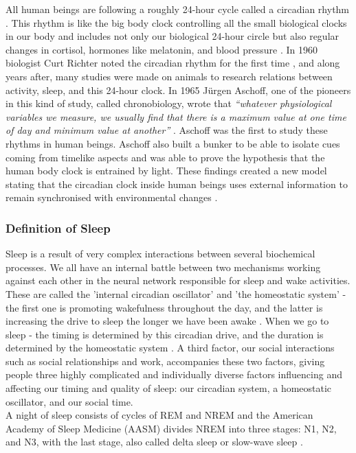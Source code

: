 \documentclass[12pt]{article} %
\begin{document}
All human beings are following a roughly 24-hour cycle called a circadian rhythm \cite{bewellSleep}. This rhythm is like the big body clock controlling all the small biological clocks in our body and includes not only our biological 24-hour circle but also regular changes in cortisol, hormones like melatonin, and blood pressure \cite{bewellSleep}. In 1960 biologist Curt Richter noted the circadian rhythm for the first time \cite{circadian}, and along years after, many studies were made on animals to research relations between activity, sleep, and this 24-hour clock. In 1965 Jürgen Aschoff, one of the pioneers in this kind of study, called chronobiology, wrote that \textit{``whatever physiological variables we measure, we usually find that there is a maximum value at one time of day and minimum value at another''} \cite{rhythm}. Aschoff was the first to study these rhythms in human beings. Aschoff also built a bunker to be able to isolate cues coming from timelike aspects \cite{rhythm2} and was able to prove the hypothesis that the human body clock is entrained by light. These findings created a new model stating that the circadian clock inside human beings uses external information to remain synchronised with environmental changes \cite{bewellSleep}.

\subsubsection{Definition of Sleep}
Sleep is a result of very complex interactions between several biochemical processes. We all have an internal battle between two mechanisms working against each other in the neural network responsible for sleep and wake activities. These are called the 'internal circadian oscillator' and 'the homeostatic system' - the first one is promoting wakefulness throughout the day, and the latter is increasing the drive to sleep the longer we have been awake \cite{promise}. When we go to sleep - the timing is determined by this circadian drive, and the duration is determined by the homeostatic system \cite{life}. A third factor, our social interactions such as social relationships and work, accompanies these two factors, giving people three highly complicated and individually diverse factors influencing and affecting our timing and quality of sleep: our circadian system, a homeostatic oscillator, and our social time.\\

A night of sleep consists of cycles of REM and NREM and the American Academy of Sleep Medicine (AASM) \cite{aasm} divides NREM into three stages: N1, N2, and N3, with the last stage, also called delta sleep or slow-wave sleep \cite{visual}. 
\end{document}
